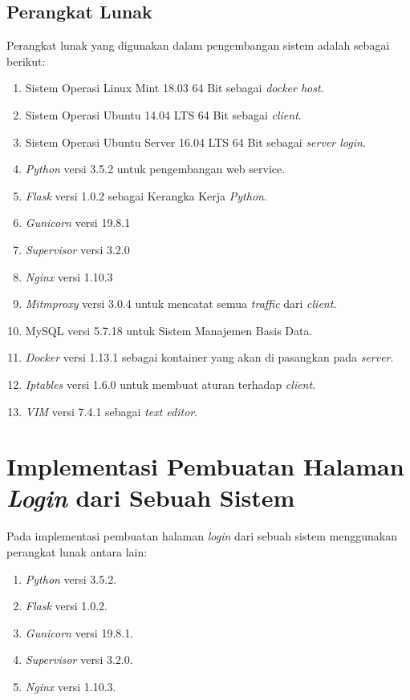     \subsection{Perangkat Lunak}
    Perangkat lunak yang digunakan dalam pengembangan sistem adalah sebagai berikut:
    \begin{enumerate}
    \item Sistem Operasi Linux Mint 18.03 64 Bit sebagai \textit{docker host}.
    \item Sistem Operasi Ubuntu 14.04 LTS 64 Bit sebagai \textit{client}.
    \item Sistem Operasi Ubuntu Server 16.04 LTS 64 Bit sebagai \textit{server login}.
    \item \textit{Python} versi 3.5.2 untuk pengembangan web service. 
    \item \textit{Flask} versi 1.0.2 sebagai Kerangka Kerja \textit{Python}.
    \item \textit{Gunicorn} versi 19.8.1
    \item \textit{Supervisor} versi 3.2.0
    \item \textit{Nginx} versi 1.10.3
    \item \textit{Mitmproxy} versi 3.0.4 untuk mencatat semua \textit{traffic} dari \textit{client}.
    \item MySQL versi 5.7.18 untuk Sistem Manajemen Basis Data.
    \item \textit{Docker} versi 1.13.1 sebagai kontainer yang akan di pasangkan pada \textit{server}.
    \item \textit{Iptables} versi 1.6.0 untuk membuat aturan terhadap \textit{client}.
    \item \textit{VIM} versi 7.4.1 sebagai \textit{text editor}.
    \end{enumerate}
    
  \section{Implementasi Pembuatan Halaman \textit{Login} dari Sebuah Sistem}
  Pada implementasi pembuatan halaman \textit{login} dari sebuah sistem menggunakan perangkat lunak antara lain:
  \begin{enumerate}
  \item \textit{Python} versi 3.5.2.
  \item \textit{Flask} versi 1.0.2.
  \item \textit{Gunicorn} versi 19.8.1.
  \item \textit{Supervisor} versi 3.2.0.
  \item \textit{Nginx} versi 1.10.3.
  \end{enumerate}

